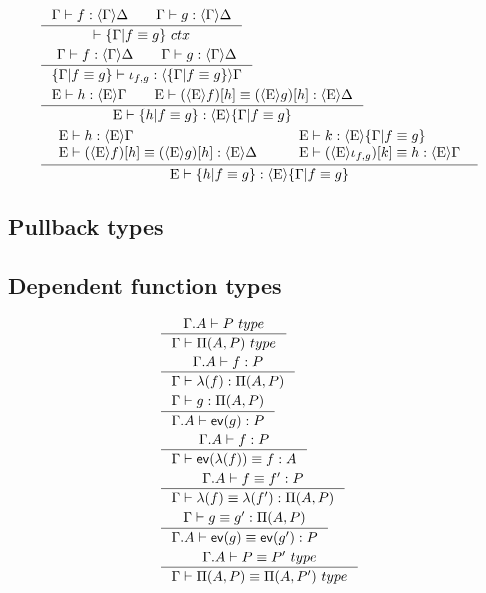 \begin{align}
& \inference{\jhom{\Gamma}{\Delta}{f}\qquad\jhom{\Gamma}{\Delta}{g}}{\jctx{\jequalizer{\Gamma}{f}{g}}}\\
& \inference{\jhom{\Gamma}{\Delta}{f}\qquad\jhom{\Gamma}{\Delta}{g}}{\jhom{\jequalizer{\Gamma}{f}{g}}{\Gamma}{\jequalizerin{f}{g}}}\\
& \inference{\jhom{\greek{E}}{\Gamma}{h}\qquad\jhomeq{\greek{E}}{\Delta}{\jcomp{\greek{E}}{h}{f}}{\jcomp{\greek{E}}{h}{g}}}{\jhom{\greek{E}}{\jequalizer{\Gamma}{f}{g}}{\jequalizer{h}{f}{g}}}\\
& \inference{
  {\begin{array}{l}
    \jhom{\greek{E}}{\Gamma}{h}\\
    \jhomeq{\greek{E}}{\Delta}{\jcomp{\greek{E}}{h}{f}}{\jcomp{\greek{E}}{h}{g}}
  \end{array}}
  \qquad
  {\begin{array}{l}
    \jhom{\greek{E}}{\jequalizer{\Gamma}{f}{g}}{k}\\
    \jhomeq{\greek{E}}{\Gamma}{\jcomp{\greek{E}}{k}{\jequalizerin{f}{g}}}{h}
  \end{array}}
}
  {\jhom{\greek{E}}{\jequalizer{\Gamma}{f}{g}}{\jequalizer{h}{f}{g}}}
\end{align}

\subsection{Pullback types}

\subsection{Dependent function types}
\begin{align}
& \inference{\jtype{\ctxext{\Gamma}{A}}{P}}{\jtype{\Gamma}{\mprd{A}{P}}}\\
& \inference{\jterm{\ctxext{\Gamma}{A}}{P}{f}}{\jterm{\Gamma}{\mprd{A}{P}}{\lambda(f)}}\\
& \inference{\jterm{\Gamma}{\mprd{A}{P}}{g}}{\jterm{\ctxext{\Gamma}{A}}{P}{\tfev(g)}}\\
& \inference{\jterm{\ctxext{\Gamma}{A}}{P}{f}}{\jtermeq{\Gamma}{A}{\tfev(\lambda(f))}{f}}\\
& \inference{\jtermeq{\ctxext{\Gamma}{A}}{P}{f}{f'}}{\jtermeq{\Gamma}{\mprd{A}{P}}{\lambda(f)}{\lambda(f')}}\\
& \inference{\jtermeq{\Gamma}{\mprd{A}{P}}{g}{g'}}{\jtermeq{\ctxext{\Gamma}{A}}{P}{\tfev(g)}{\tfev(g')}}\\
& \inference{\jtypeeq{\ctxext{\Gamma}{A}}{P}{P'}}{\jtypeeq{\Gamma}{\mprd{A}{P}}{\mprd{A}{P'}}}\\
\end{align}


